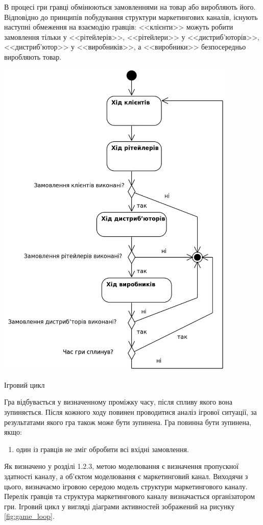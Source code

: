 В процесі гри гравці обмінюються замовленнями на товар або виробляють його. Відповідно до принципів побудування структури маркетингових каналів, існують наступні обмеження на взаємодію гравців: <<клієнти>> можуть робити замовлення тільки у <<рітейлерів>>, <<рітейлери>> у <<дистриб’юторів>>, <<дистриб’ютор>> у <<виробників>>, а <<виробники>> безпосередньо виробляють товар.
\begin{stdfigure}  
                \includegraphics[width=4.5in]{images/game_loop.png}
                \caption{Ігровий цикл}
                \label{fig:game_loop}
            \end{stdfigure}
Гра відбувається у визначенному проміжку часу, після спливу якого вона зупиняється. Після кожного ходу повинен проводитися аналіз ігрової ситуації, за результатами якого гра також може бути зупинена. Гра повинна бути зупинена, якщо: 
\begin{enumerate}
\item один із гравців не зміг обробити всі вхідні замовлення.
\end{enumerate}
 
Як визначено у розділі 1.2.3, метою моделювання є визначення пропускної здатності каналу, а об’єктом моделювання є маркетинговий канал. Виходячи з цього, визначаємо ігровою середою модель структури маркетингового каналу. Перелік гравців та структура маркетингового каналу визначається організатором гри. Ігровий цикл у вигляді діаграми активностей зображений на рисунку \ref{fig:game_loop}.

